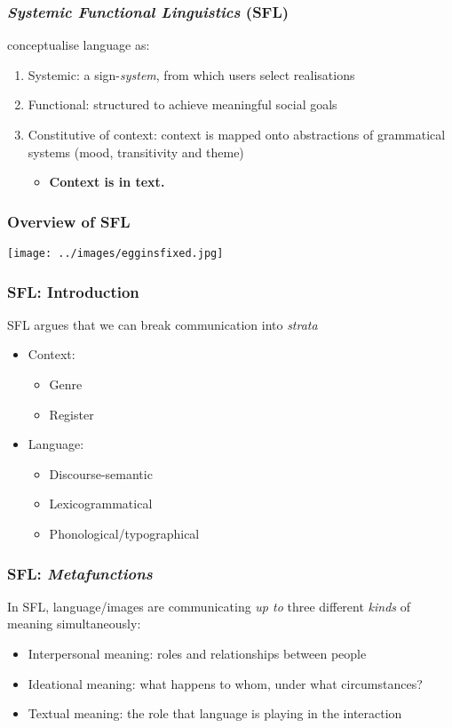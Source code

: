 \documentclass{beamer}       %
\begin{document}
\begin{frame}
    \frametitle{\emph{Systemic Functional Linguistics} (SFL)}

 conceptualise language as:
\begin{enumerate}
 \item Systemic: a sign-\emph{system}, from which users select realisations
 \item Functional: structured to achieve meaningful social goals
 \item Constitutive of context: context is mapped onto abstractions of grammatical systems (mood, transitivity and theme)
 \begin{itemize}
 \item \textbf{Context is in text.}
 \end{itemize}
 \end{enumerate} 

\end{frame}

\begin{frame}
    \frametitle{Overview of SFL}
    \centering
    \texttt{[image: ../images/egginsfixed.jpg]}
\end{frame}

\begin{frame}
\frametitle{SFL: Introduction}
SFL argues that we can break communication into \emph{strata}
\begin{itemize}
\item Context:
\begin{itemize}
    	\item Genre
    	\item Register
\end{itemize}
\item Language:
\begin{itemize}    	
    	\item Discourse-semantic
    	\item Lexicogrammatical
    	\item Phonological/typographical
    \end{itemize}
\end{itemize}
\end{frame}
 
\begin{frame}
\frametitle{SFL: \emph{Metafunctions}}
In SFL, language/images are communicating \emph{up to} three different \emph{kinds} of meaning simultaneously:
\begin{itemize}
	\item Interpersonal meaning: roles and relationships between people
	\item Ideational meaning: what happens to whom, under what circumstances?
	\item Textual meaning: the role that language is playing in the interaction
\end{itemize}
    \end{frame}
\end{document}

